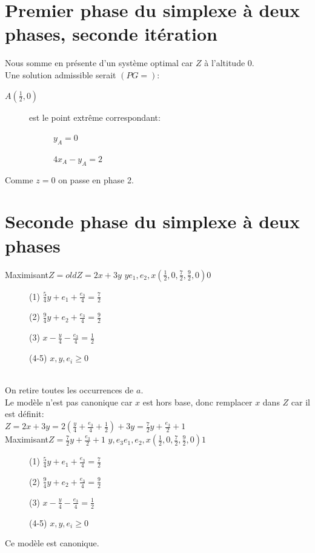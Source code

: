 \section{Premier phase du simplexe à deux phases, seconde itération}
Nous somme en présente d'un système optimal car $Z$ à l'altitude 0.\\
Une solution admissible serait $(PG=)$:
\begin{description}
\item[$A(\frac{1}{2},0)$] est le point extrême correspondant:
\item[] \begin{description}
\item[] $y_A = 0$
\item[] $4x_A - y_A = 2$
\end{description}
\end{description}

Comme $z = 0$ on passe en phase 2.
\section{Seconde phase du simplexe à deux phases}
        {Maximisant}{$Z = oldZ = 2x + 3y$}
        {$y$}{$e_1,e_2,x$}{$(\frac{1}{2},0,\frac{7}{2}, \frac{9}{2}, 0)$}{$0$}
        {\begin{description}
\item[] (1) $\frac{5}{4}y + e_1 + \frac{e_3}{4} = \frac{7}{2}$
\item[] (2) $\frac{9}{4}y + e_2 + \frac{e_3}{4} = \frac{9}{2}$
\item[] (3) $x - \frac{y}{4} - \frac{e_3}{4} = \frac{1}{2}$
\item[] (4-5) $x,y,e_i \geqslant 0$
\end{description}
}\ \\
On retire toutes les occurrences de $a$.\\
Le modèle n'est pas canonique car $x$ est hors base, donc remplacer $x$ dans $Z$ car il est définit:\\
$Z = 2x + 3y = 2(\frac{y}{4} + \frac{e_3}{4} + \frac{1}{2}) + 3y = \frac{7}{2}y + \frac{e_3}{2} + 1$\\

        {Maximisant}{$Z = \frac{7}{2}y + \frac{e_3}{2} + 1$}
        {$y,e_3$}{$e_1,e_2,x$}{$(\frac{1}{2},0,\frac{7}{2}, \frac{9}{2}, 0)$}{$1$}
        {\begin{description}
\item[] (1) $\frac{5}{4}y + e_1 + \frac{e_3}{4} = \frac{7}{2}$
\item[] (2) $\frac{9}{4}y + e_2 + \frac{e_3}{4} = \frac{9}{2}$
\item[] (3) $x - \frac{y}{4} - \frac{e_3}{4} = \frac{1}{2}$
\item[] (4-5) $x,y,e_i \geqslant 0$
\end{description}
}
Ce modèle est canonique.

